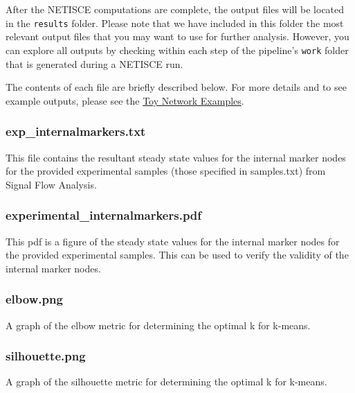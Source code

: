 \documentclass[
]{book}
\begin{document}
After the NETISCE computations are complete, the output files will be located in the \texttt{results} folder. Please note that we have included in this folder the most relevant output files that you may want to use for further analysis. However, you can explore all outputs by checking within each step of the pipeline's \texttt{work} folder that is generated during a NETISCE run.

The contents of each file are briefly described below. For more details and to see example outputs, please see the \protect\hyperlink{toy}{Toy Network Examples}.

\hypertarget{section-id}{%
\subsubsection*{exp\_internalmarkers.txt}\label{section-id}}

This file contains the resultant steady state values for the internal marker nodes for the provided experimental samples (those specified in samples.txt) from Signal Flow Analysis.

\hypertarget{section-id}{%
\subsubsection*{experimental\_internalmarkers.pdf}\label{section-id}}

This pdf is a figure of the steady state values for the internal marker nodes for the provided experimental samples. This can be used to verify the validity of the internal marker nodes.

\hypertarget{section-id}{%
\subsubsection*{elbow.png}\label{section-id}}

A graph of the elbow metric for determining the optimal k for k-means.

\hypertarget{section-id}{%
\subsubsection*{silhouette.png}\label{section-id}}

A graph of the silhouette metric for determining the optimal k for k-means.
\end{document}

